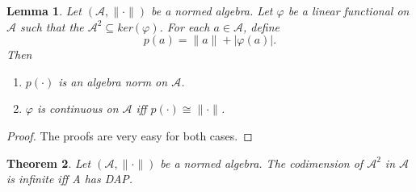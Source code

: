 \documentclass{amsart}
\newtheorem{thm}{Theorem}[section]
\newtheorem{lem}[thm]{Lemma}
\theoremstyle{definition}
\numberwithin{equation}{section}
\begin{document}
\begin{lem}
	Let $(\mathcal{A}, \| \cdot \|)$ be a normed algebra. Let $ \varphi$ be a linear functional on $\mathcal{A}$ such that the $\mathcal{A}^2 \subseteq $ker$ (\varphi)$. For each $a \in \mathcal{A}$, define $$p(a) = \| a \| + |\varphi(a)| .$$ Then
	\begin{enumerate}
		\item $p(\cdot)$ is an algebra norm on $\mathcal{A}$.
		\item  $\varphi$ is continuous on $\mathcal{A}$ iff $p(\cdot) \cong \| \cdot \|$.
	\end{enumerate}
\end{lem}

\begin{proof}
	The proofs are very easy for both cases.
\end{proof}



\begin{thm}
	Let $(\mathcal{A}, \| \cdot \|)$ be a normed algebra. The codimension of $\mathcal{A}^2$ in $\mathcal{A}$ is infinite iff A has DAP.
\end{thm}
\end{document}
